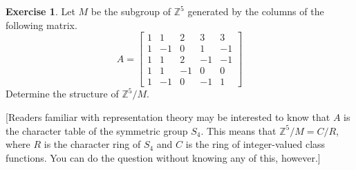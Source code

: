 \documentclass{amsart}
\newcommand{\bbm}       {\left[\begin{matrix}}
\newcommand{\ebm}       {\end{matrix}\right]}
\newcommand{\Z}         {{\mathbb{Z}}}
\newcommand{\ip}[1]     {\langle #1\rangle}
\renewcommand{\:}{\colon}
\theoremstyle{definition}
\newtheorem{exercise}{Exercise}[section]
\begin{document}
\begin{exercise}
 Let $M$ be the subgroup of $\Z^5$ generated by the columns of the
 following matrix.  
 \[ A = \bbm 1 &  1 &  2 &  3 &  3 \\
             1 & -1 &  0 &  1 & -1 \\
             1 &  1 &  2 & -1 & -1 \\
             1 &  1 & -1 &  0 &  0 \\
             1 & -1 &  0 & -1 &  1 \ebm
 \]
 Determine the structure of $\Z^5/M$.

 [Readers familiar with representation theory may be interested to
 know that $A$ is the character table of the symmetric group $S_4$.
 This means that $\Z^5/M=C/R$, where $R$ is the character ring of
 $S_4$ and $C$ is the ring of integer-valued class functions.  You can
 do the question without knowing any of this, however.]
\end{exercise}
\end{document}
